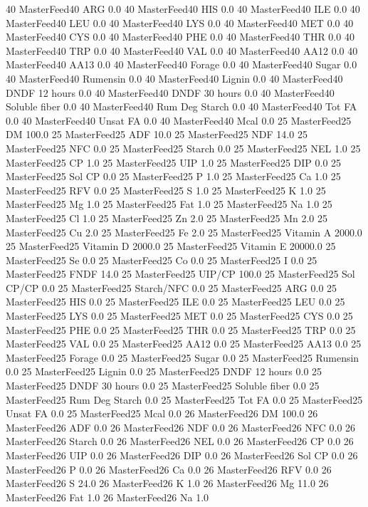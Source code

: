 \documentclass[letterpaper,10pt,english]{sphinxmanual}
\begin{document}
\begin{sphinxVerbatim}[commandchars=\\\{\},numbers=left,firstnumber=1,stepnumber=1]
40 MasterFeed40 ARG 0.0
40 MasterFeed40 HIS 0.0
40 MasterFeed40 ILE 0.0
40 MasterFeed40 LEU 0.0
40 MasterFeed40 LYS 0.0
40 MasterFeed40 MET 0.0
40 MasterFeed40 CYS 0.0
40 MasterFeed40 PHE 0.0
40 MasterFeed40 THR 0.0
40 MasterFeed40 TRP 0.0
40 MasterFeed40 VAL 0.0
40 MasterFeed40 AA\PYGZsh{}12 0.0
40 MasterFeed40 AA\PYGZsh{}13 0.0
40 MasterFeed40 \PYGZpc{} Forage 0.0
40 MasterFeed40 Sugar \PYGZpc{} 0.0
40 MasterFeed40 Rumensin 0.0
40 MasterFeed40 Lignin 0.0
40 MasterFeed40 DNDF 12 hours 0.0
40 MasterFeed40 DNDF 30 hours 0.0
40 MasterFeed40 Soluble fiber 0.0
40 MasterFeed40 Rum Deg Starch 0.0
40 MasterFeed40 Tot FA 0.0
40 MasterFeed40 Unsat FA 0.0
40 MasterFeed40 Mcal 0.0
25 MasterFeed25 DM 100.0
25 MasterFeed25 ADF 10.0
25 MasterFeed25 NDF 14.0
25 MasterFeed25 NFC 0.0
25 MasterFeed25 Starch 0.0
25 MasterFeed25 NEL 1.0
25 MasterFeed25 CP 1.0
25 MasterFeed25 UIP 1.0
25 MasterFeed25 DIP 0.0
25 MasterFeed25 Sol CP 0.0
25 MasterFeed25 P 1.0
25 MasterFeed25 Ca 1.0
25 MasterFeed25 RFV 0.0
25 MasterFeed25 S 1.0
25 MasterFeed25 K 1.0
25 MasterFeed25 Mg 1.0
25 MasterFeed25 Fat 1.0
25 MasterFeed25 Na 1.0
25 MasterFeed25 Cl 1.0
25 MasterFeed25 Zn 2.0
25 MasterFeed25 Mn 2.0
25 MasterFeed25 Cu 2.0
25 MasterFeed25 Fe 2.0
25 MasterFeed25 Vitamin A 2000.0
25 MasterFeed25 Vitamin D 2000.0
25 MasterFeed25 Vitamin E 20000.0
25 MasterFeed25 Se 0.0
25 MasterFeed25 Co 0.0
25 MasterFeed25 I 0.0
25 MasterFeed25 FNDF 14.0
25 MasterFeed25 UIP/CP 100.0
25 MasterFeed25 Sol CP/CP 0.0
25 MasterFeed25 Starch/NFC 0.0
25 MasterFeed25 ARG 0.0
25 MasterFeed25 HIS 0.0
25 MasterFeed25 ILE 0.0
25 MasterFeed25 LEU 0.0
25 MasterFeed25 LYS 0.0
25 MasterFeed25 MET 0.0
25 MasterFeed25 CYS 0.0
25 MasterFeed25 PHE 0.0
25 MasterFeed25 THR 0.0
25 MasterFeed25 TRP 0.0
25 MasterFeed25 VAL 0.0
25 MasterFeed25 AA\PYGZsh{}12 0.0
25 MasterFeed25 AA\PYGZsh{}13 0.0
25 MasterFeed25 \PYGZpc{} Forage 0.0
25 MasterFeed25 Sugar \PYGZpc{} 0.0
25 MasterFeed25 Rumensin 0.0
25 MasterFeed25 Lignin 0.0
25 MasterFeed25 DNDF 12 hours 0.0
25 MasterFeed25 DNDF 30 hours 0.0
25 MasterFeed25 Soluble fiber 0.0
25 MasterFeed25 Rum Deg Starch 0.0
25 MasterFeed25 Tot FA 0.0
25 MasterFeed25 Unsat FA 0.0
25 MasterFeed25 Mcal 0.0
26 MasterFeed26 DM 100.0
26 MasterFeed26 ADF 0.0
26 MasterFeed26 NDF 0.0
26 MasterFeed26 NFC 0.0
26 MasterFeed26 Starch 0.0
26 MasterFeed26 NEL 0.0
26 MasterFeed26 CP 0.0
26 MasterFeed26 UIP 0.0
26 MasterFeed26 DIP 0.0
26 MasterFeed26 Sol CP 0.0
26 MasterFeed26 P 0.0
26 MasterFeed26 Ca 0.0
26 MasterFeed26 RFV 0.0
26 MasterFeed26 S 24.0
26 MasterFeed26 K 1.0
26 MasterFeed26 Mg 11.0
26 MasterFeed26 Fat 1.0
26 MasterFeed26 Na 1.0

\end{sphinxVerbatim}
\end{document}
